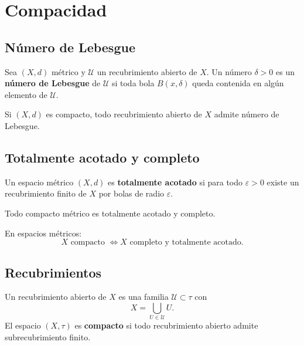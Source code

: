 ﻿\section{Compacidad}


\subsection{Número de Lebesgue}

\begin{definición}
    Sea $(X,d)$ métrico y $\mathcal U$ un recubrimiento abierto de $X$. Un número $\delta>0$ es un \textbf{número de Lebesgue} de $\mathcal U$ si toda bola $B(x,\delta)$ queda contenida en algún elemento de $\mathcal U$.
\end{definición}

\begin{teorema}
    Si $(X,d)$ es compacto, todo recubrimiento abierto de $X$ admite número de Lebesgue.
\end{teorema}

\subsection{Totalmente acotado y completo}

\begin{definición}
    Un espacio métrico $(X,d)$ es \textbf{totalmente acotado} si para todo $\varepsilon>0$ existe un recubrimiento finito de $X$ por bolas de radio $\varepsilon$.
\end{definición}

\begin{proposición}
    Todo compacto métrico es totalmente acotado y completo.
\end{proposición}

\begin{teorema}
    En espacios métricos:
    $$X \text{ compacto } \Longleftrightarrow X \text{ completo y totalmente acotado.}$$
\end{teorema}


\subsection{Recubrimientos}

\begin{definición}
    Un recubrimiento abierto de $X$ es una familia $\mathcal U\subset \tau$ con
    $$X=\bigcup_{U\in\mathcal U} U.$$
    El espacio $(X,\tau)$ es \textbf{compacto} si todo recubrimiento abierto admite subrecubrimiento finito.
\end{definición}

